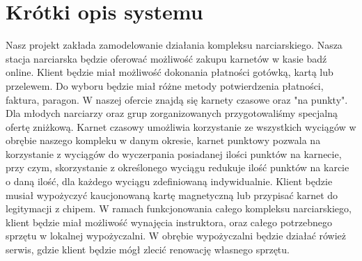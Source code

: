 \newpage
\section{Krótki opis systemu}
\large		
Nasz projekt zakłada zamodelowanie działania kompleksu narciarskiego. Nasza stacja narciarska będzie oferować możliwość zakupu karnetów w kasie badź online. Klient będzie miał możliwość dokonania płatności gotówką, kartą lub przelewem. Do wyboru będzie miał różne metody potwierdzenia płatności, faktura, paragon. W naszej ofercie znajdą się karnety czasowe oraz "na punkty". Dla młodych narciarzy oraz grup zorganizowanych przygotowaliśmy specjalną ofertę zniżkową. Karnet czasowy umożliwia korzystanie ze wszystkich wyciągów w obrębie naszego kompleku w danym okresie, karnet punktowy pozwala na korzystanie z wyciągów do wyczerpania posiadanej ilości punktów na karnecie, przy czym, skorzystanie z określonego wyciągu redukuje ilość punktów na karcie o daną ilość, dla każdego wyciągu zdefiniowaną indywidualnie. Klient będzie musiał wypożyczyć kaucjonowaną kartę magnetyczną lub przypisać karnet do legitymacji z chipem. W ramach funkcjonowania całego kompleksu narciarskiego, klient będzie miał możliwość wynajęcia instruktora, oraz całego potrzebnego sprzętu w lokalnej wypożyczalni. W obrębie wypożyczalni będzie działać rówież serwis, gdzie klient będzie mógł zlecić renowację własnego sprzętu.